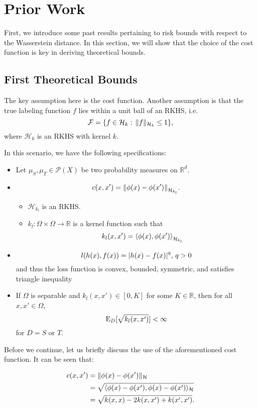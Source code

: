 \section*{Prior Work}

First, we introduce some past results pertaining to risk bounds with respect to the Wasserstein distance. In this section, we will show that the choice of the cost function is key in deriving theoretical bounds.

\subsection*{First Theoretical Bounds \cite{Redko2017}}
The key assumption here is the cost function. Another assumption is that the true labeling function $f$ lies within a unit ball of an RKHS, i.e. \[\mathcal{F} = \{f\in \mathcal{H}_k: \, \norm{f}_{\mathcal{H}_k}\leq 1\},\] where $\mathcal{H}_k$ is an RKHS with kernel $k$.

In this scenario, we have the following specifications:
\begin{itemize}
	\item Let $\mu_S, \mu_T\in \mathcal{P}(X)$ be two probability measures on $\mathbb{R}^d$.
	\item \[c(x,x') = \norm*{\phi(x)-\phi(x')}_{\mathcal{H}_{k_l}}.\] 
	\begin{itemize}
		\item $\mathcal{H}_{k_l}$ is an RKHS.
		\item $k_l: \Omega\times \Omega\to \mathbb{R}$ is a kernel function such that \[k_l(x,x')=\ang*{\phi(x),\phi(x')}_{\mathcal{H}_{k_l}}\]
	\end{itemize}
	\item \[l(h(x),f(x)) = \abs*{h(x)-f(x)}^q,\, q>0\] and thus the loss function is convex, bounded, symmetric, and satisfies triangle inequality
	\item If $\Omega$ is separable and $k_l(x,x')\in [0,K]$ for some $K\in \mathbb{R}$, then for all $x,x'\in \Omega$,
	\[
	\E_D[\sqrt{k_l(x,x')}]<\infty
	\] for $D=S$ or $T$.
\end{itemize}

Before we continue, let us briefly discuss the use of the aforementioned cost function. It can be seen that:

\begin{align*}
c(x,x')&=\norm{\phi(x)-\phi(x')}_{\mathcal{H}} \\
&= \sqrt{\ang{\phi(x)-\phi(x'),\phi(x)-\phi(x')}_{\mathcal{H}}} \\
&= \sqrt{k(x,x)-2k(x,x')+k(x',x')}.
\end{align*}

